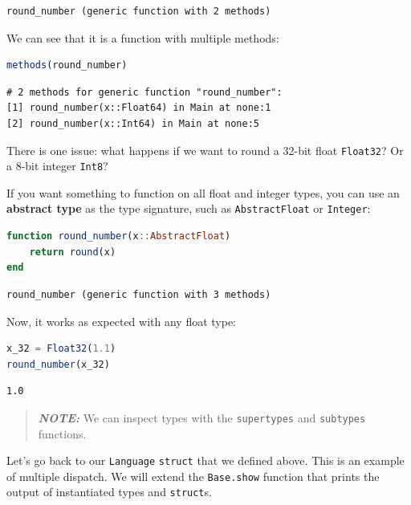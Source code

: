 \documentclass[
  notoc %
]{tufte-book}
\newcommand{\passthrough}[1]{#1}
\begin{document}
\begin{lstlisting}[language=Output]
round_number (generic function with 2 methods)
\end{lstlisting}

We can see that it is a function with multiple methods:

\begin{lstlisting}[language=Julia]
methods(round_number)
\end{lstlisting}

\begin{lstlisting}[language=Output]
# 2 methods for generic function "round_number":
[1] round_number(x::Float64) in Main at none:1
[2] round_number(x::Int64) in Main at none:5
\end{lstlisting}

There is one issue: what happens if we want to round a 32-bit float
\passthrough{\lstinline!Float32!}? Or a 8-bit integer
\passthrough{\lstinline!Int8!}?

If you want something to function on all float and integer types, you
can use an \textbf{abstract type} as the type signature, such as
\passthrough{\lstinline!AbstractFloat!} or
\passthrough{\lstinline!Integer!}:

\begin{lstlisting}[language=Julia]
function round_number(x::AbstractFloat)
    return round(x)
end
\end{lstlisting}

\begin{lstlisting}[language=Output]
round_number (generic function with 3 methods)
\end{lstlisting}

Now, it works as expected with any float type:

\begin{lstlisting}[language=Julia]
x_32 = Float32(1.1)
round_number(x_32)
\end{lstlisting}

\begin{lstlisting}[language=Output]
1.0
\end{lstlisting}

\begin{quote}
\textbf{\emph{NOTE:}} We can inspect types with the
\passthrough{\lstinline!supertypes!} and
\passthrough{\lstinline!subtypes!} functions.
\end{quote}

Let's go back to our \passthrough{\lstinline!Language!}
\passthrough{\lstinline!struct!} that we defined above. This is an
example of multiple dispatch. We will extend the
\passthrough{\lstinline!Base.show!} function that prints the output of
instantiated types and \passthrough{\lstinline!struct!}s.
\end{document}
